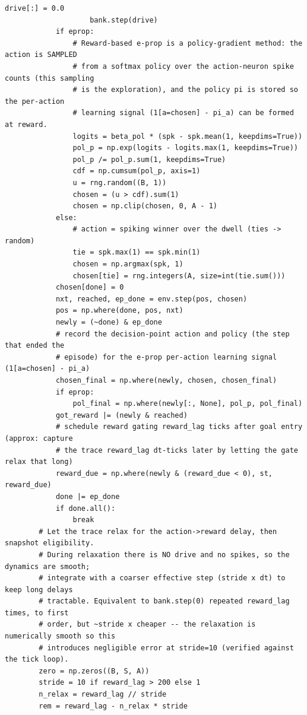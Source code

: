 \begin{lstlisting}[caption={mrl\_trace/maze.py},label={lst:siox-src-maze}]
                        drive[:] = 0.0
                    bank.step(drive)
            if eprop:
                # Reward-based e-prop is a policy-gradient method: the action is SAMPLED
                # from a softmax policy over the action-neuron spike counts (this sampling
                # is the exploration), and the policy pi is stored so the per-action
                # learning signal (1[a=chosen] - pi_a) can be formed at reward.
                logits = beta_pol * (spk - spk.mean(1, keepdims=True))
                pol_p = np.exp(logits - logits.max(1, keepdims=True))
                pol_p /= pol_p.sum(1, keepdims=True)
                cdf = np.cumsum(pol_p, axis=1)
                u = rng.random((B, 1))
                chosen = (u > cdf).sum(1)
                chosen = np.clip(chosen, 0, A - 1)
            else:
                # action = spiking winner over the dwell (ties -> random)
                tie = spk.max(1) == spk.min(1)
                chosen = np.argmax(spk, 1)
                chosen[tie] = rng.integers(A, size=int(tie.sum()))
            chosen[done] = 0
            nxt, reached, ep_done = env.step(pos, chosen)
            pos = np.where(done, pos, nxt)
            newly = (~done) & ep_done
            # record the decision-point action and policy (the step that ended the
            # episode) for the e-prop per-action learning signal (1[a=chosen] - pi_a)
            chosen_final = np.where(newly, chosen, chosen_final)
            if eprop:
                pol_final = np.where(newly[:, None], pol_p, pol_final)
            got_reward |= (newly & reached)
            # schedule reward gating reward_lag ticks after goal entry (approx: capture
            # the trace reward_lag dt-ticks later by letting the gate relax that long)
            reward_due = np.where(newly & (reward_due < 0), st, reward_due)
            done |= ep_done
            if done.all():
                break
        # Let the trace relax for the action->reward delay, then snapshot eligibility.
        # During relaxation there is NO drive and no spikes, so the dynamics are smooth;
        # integrate with a coarser effective step (stride x dt) to keep long delays
        # tractable. Equivalent to bank.step(0) repeated reward_lag times, to first
        # order, but ~stride x cheaper -- the relaxation is numerically smooth so this
        # introduces negligible error at stride=10 (verified against the tick loop).
        zero = np.zeros((B, S, A))
        stride = 10 if reward_lag > 200 else 1
        n_relax = reward_lag // stride
        rem = reward_lag - n_relax * stride

\end{lstlisting}
